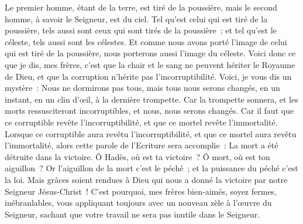 \begin{multicols}{2}
Le premier homme, étant de la terre, est tiré de la poussière, mais le second homme, à savoir le Seigneur, est du ciel.
Tel qu'est celui qui est tiré de la poussière, tels aussi sont ceux qui sont tirés de la poussière~; et tel qu'est le céleste, tels aussi sont les célestes.
Et comme nous avons porté l'image de celui qui est tiré de la poussière, nous porterons aussi l'image du céleste.
Voici donc ce que je dis, mes frères, c'est que la chair et le sang ne peuvent hériter le Royaume de Dieu, et que la corruption n'hérite pas l'incorruptibilité.
Voici, je vous dis un mystère~: Nous ne dormirons pas tous, mais tous nous serons changés,
en un instant, en un clin d'œil, à la dernière trompette. Car la trompette sonnera, et les morts ressusciteront incorruptibles, et nous, nous serons changés.
Car il faut que ce corruptible revête l'incorruptibilité, et que ce mortel revête l'immortalité.
Lorsque ce corruptible aura revêtu l'incorruptibilité, et que ce mortel aura revêtu l'immortalité, alors cette parole de l'Ecriture sera accomplie~: La mort a été détruite dans la victoire.
Ô Hadès, où est ta victoire~? Ô mort, où est ton aiguillon~?
Or l'aiguillon de la mort c'est le péché~; et la puissance du péché c'est la loi.
Mais grâces soient rendues à Dieu qui nous a donné la victoire par notre Seigneur Jésus-Christ~!
C'est pourquoi, mes frères bien-aimés, soyez fermes, inébranlables, vous appliquant toujours avec un nouveau zèle à l'œuvre du Seigneur, sachant que votre travail ne sera pas inutile dans le Seigneur.

\end{multicols}
